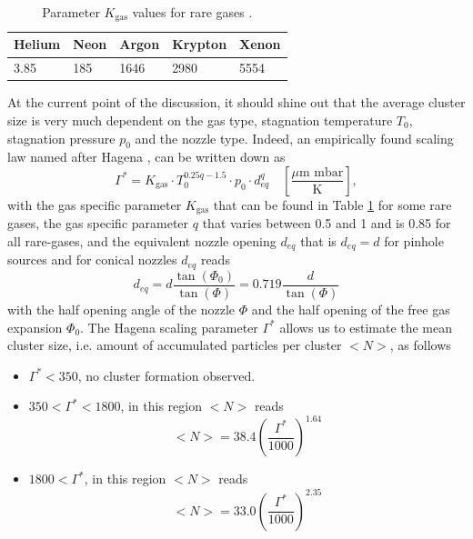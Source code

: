 \begin{table}
	\centering
		\begin{tabular}{ | l | l | l | l | l | }
			\hline
			Helium & Neon & Argon & Krypton & Xenon \\ \hline
			3.85 & 185 & 1646 & 2980 & 5554 \\ \hline
		\end{tabular}
	\caption[Parameter $K_{\text{gas}}$ values for rare gases.]{Parameter $K_{\text{gas}}$ values for rare gases \cite{Schorb-2012-Thesis}.}
	\label{tab:k-parameter}
\end{table}
At the current point of the discussion, it should shine out that the average cluster size is very much dependent on the gas type, stagnation temperature $T_{0}$, stagnation pressure $p_{0}$ and the nozzle type. Indeed, an empirically found scaling law named after Hagena \cite{Hagena-1972-JCP,Hagena-1981-SurfSci,Hagena-1987-ZeitschriftAMC}, can be written down as
\begin{equation}
\Gamma^{*} = K_{\text{gas}} \cdot T_{0}^{0.25q-1.5} \cdot p_{0} \cdot d_{eq}^{q}\quad \left[\frac{\text{$\mu$m mbar}}{\text{K}}\right],
\label{eq:Hagena-parameter}
\end{equation}
with the gas specific parameter $K_{\text{gas}}$ that can be found in Table \ref{tab:k-parameter} for some rare gases, the gas specific parameter $q$ that varies between 0.5 and 1 and is 0.85 for all rare-gases, and the equivalent nozzle opening $d_{eq}$ that is $d_{eq}=d$ for pinhole sources and for conical nozzles $d_{eq}$ reads \citep{Schorb-2012-Thesis}
\begin{equation}
d_{eq} = d\frac{\tan\left(\Phi_{0}\right)}{\tan\left(\Phi\right)} = 0.719 \frac{d}{\tan\left(\Phi\right)}
\label{eq:equivalent-nozzle-opening}
\end{equation}
with the half opening angle of the nozzle $\Phi$ and the half opening of the free gas expansion $\Phi_{0}$. The Hagena scaling parameter $\Gamma^{*}$ allows us to estimate the mean cluster size, i.e. amount of accumulated particles per cluster $<N>$, as follows
\begin{itemize}
	\item $\Gamma^{*} < 350$, no cluster formation observed.
	\item $350 < \Gamma^{*} < 1800$, in this region $<N>$ reads
		\begin{equation}
		<N> = 38.4 \left(\frac{\Gamma^{*}}{1000}\right)^{1.64}
		\label{eq:intermediate-hagena-scaling}
		\end{equation}
	\item $1800 < \Gamma^{*}$, in this region $<N>$ reads
		\begin{equation}
		<N> = 33.0 \left(\frac{\Gamma^{*}}{1000}\right)^{2.35}
		\label{eq:large-hagena-scaling}
		\end{equation}
\end{itemize}
